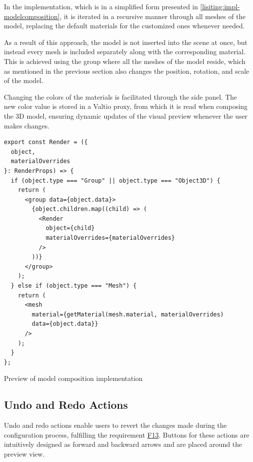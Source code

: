 In the implementation, which is in a simplified form presented in \autoref{lisiting:impl-modelcomposition}, it is iterated in a recursive manner through all meshes of the model, replacing the default materials for the customized ones whenever needed. 

As a result of this approach, the model is not inserted into the scene at once, but instead every mesh is included separately along with the corresponding material. This is achieved using the group where all the meshes of the model reside, which as mentioned in the previous section also changes the position, rotation, and scale of the model.

Changing the colors of the materials is facilitated through the side panel. The new color value is stored in a Valtio proxy, from which it is read when composing the 3D model, ensuring dynamic updates of the visual preview whenever the user makes changes.

\begin{listing}[h!]
\begin{verbatim}
export const Render = ({
  object,
  materialOverrides
}: RenderProps) => {
  if (object.type === "Group" || object.type === "Object3D") {
    return (
      <group data={object.data}>
        {object.children.map((child) => (
          <Render
            object={child}
            materialOverrides={materialOverrides}
          />
        ))}
      </group>
    );
  } else if (object.type === "Mesh") {
    return (
      <mesh
        material={getMaterial(mesh.material, materialOverrides) 
        data={object.data}}
      />
    );
  }
};
\end{verbatim}
\caption{Preview of model composition implementation}
\label{lisiting:impl-modelcomposition}
\end{listing}


\subsection{Undo and Redo Actions}

Undo and redo actions enable users to revert the changes made during the configuration process, fulfilling the requirement \hyperref[itm:F13]{F13}. Buttons for these actions are intuitively designed as forward and backward arrows and are placed around the preview view.

